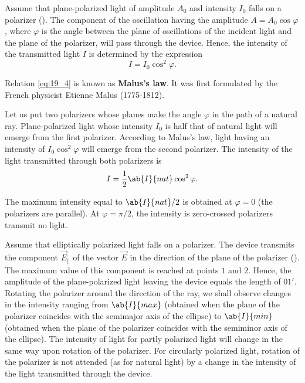 Assume that plane-polarized light of amplitude $A_0$ and intensity $I_0$ falls on a polarizer ().
The component of the oscillation having the amplitude $A=A_0\cos\varphi$, where $\varphi$ is the angle between the plane of oscillations of the incident light and the plane of the polarizer, will pass through the device.
Hence, the intensity of the transmitted light $I$ is determined by the expression
\begin{equation}\label{eq:19_4}
	I = I_0 \cos^2\varphi.
\end{equation}

\noindent
Relation \eqref{eq:19_4} is known as \textbf{Malus's law}.
It was first formulated by the French physicist Etienne Malus (1775-1812).

Let us put two polarizers whose planes make the angle $\varphi$ in the path of a natural ray.
Plane-polarized light whose intensity $I_0$ is half that of natural light will emerge from the first polarizer.
According to Malus's law, light having an intensity of $I_0\cos^2\varphi$ will emerge from the second polarizer.
The intensity of the light transmitted through both polarizers is
\begin{equation}\label{eq:19_5}
	I = \frac{1}{2} \ab{I}{nat} \cos^2\varphi.
\end{equation}

\noindent
The maximum intensity equal to $\ab{I}{nat}/2$ is obtained at $\varphi=0$ (the polarizers are parallel).
At $\varphi=\pi/2$, the intensity is zero-crossed
polarizers transmit no light.

Assume that elliptically polarized light falls on a polarizer.
The device transmits the component $\vec{E}_{\parallel}$ of the vector $\vec{E}$ in the direction of the plane of the polarizer ().
The maximum value of this component is reached at points $1$ and $2$.
Hence, the amplitude of the plane-polarized light leaving the device equals the length of $01'$.
Rotating the polarizer around the direction of the ray, we shall observe changes in the intensity ranging from $\ab{I}{max}$ (obtained when the plane of the polarizer coincides with the semimajor axis of the ellipse) to $\ab{I}{min}$ (obtained when the plane of the polarizer coincides with the semiminor axis of the ellipse).
The intensity of light for partly polarized light will change in the same way upon rotation of the polarizer.
For circularly polarized light, rotation of the polarizer is not attended (as for natural light) by a change in the intensity of the light transmitted through the device.

